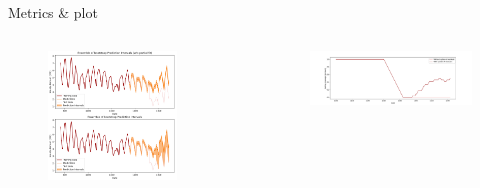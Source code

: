 \documentclass{beamer}
\begin{document}
\begin{frame}{Metrics \& plot}
\begin{minipage}{\textwidth}

    \begin{columns} %
        \vspace{-5mm}
        \begin{column}{0.5\textwidth}
            \centering
            \begin{figure} %
                \centering
                \includegraphics[width=0.8\textwidth, height=0.75\textwidth]{Figures/timeseries/with-change-point/prediction-intervals-timeseries-problem-with-change-point.png}
            \end{figure}
        \end{column}
        \begin{column}{0.5\textwidth}
            \vspace{-7mm}
            \begin{figure}
                \centering
                \includegraphics[width=\textwidth, height=0.5\textwidth]{Figures/timeseries/with-change-point/rolling-coverage-with-change-point.png}

\end{figure}
\end{column}
\end{columns}
\end{minipage}
\end{frame}
\end{document}

